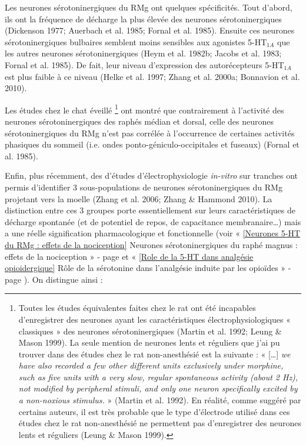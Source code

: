 \documentclass[a4paper,12pt,twoside]{report}
\begin{document}
Les neurones sérotoninergiques du RMg ont quelques spécificités. Tout d’abord, ils ont la fréquence de décharge la plus élevée des neurones sérotoninergiques (Dickenson 1977; Auerbach et al. 1985; Fornal et al. 1985). Ensuite ces neurones sérotoninergiques bulbaires semblent moins sensibles aux agonistes 5-HT$_{1A}$ que les autres neurones sérotoninergiques (Heym et al. 1982b; Jacobs et al. 1983; Fornal et al. 1985). De fait, leur niveau d’expression des autorécepteurs 5-HT$_{1A}$ est plus faible à ce niveau (Helke et al. 1997; Zhang et al. 2000a; Bonnavion et al. 2010).

Les études chez le chat éveillé
\footnote{Toutes les études équivalentes faites chez le rat ont été incapables d’enregistrer des neurones ayant les caractéristiques électrophysiologiques « classiques » des neurones sérotoninergiques (Martin et al. 1992; Leung \& Mason 1999). La seule mention de neurones lents et réguliers que j’ai pu trouver dans des études chez le rat non-anesthésié est la suivante : « […] \textit{we have also recorded a few other different units exclusively under morphine, such as five units with a very slow, regular spontaneous activity (about 2 Hz), not modified by peripheral stimuli, and only one neuron specifically excited by a non-noxious stimulus.} » (Martin et al. 1992). En réalité, comme suggéré par certains auteurs, il est très probable que le type d’électrode utilisé dans ces études chez le rat non-anesthésié ne permettent pas d’enregistrer des neurones lents et réguliers (Leung \& Mason 1999).}
ont montré que contrairement à l’activité des neurones sérotoninergiques des raphés médian et dorsal, celle des neurones sérotoninergiques du RMg n’est pas corrélée à l’occurrence de certaines activités phasiques du sommeil (i.e. ondes ponto-géniculo-occipitales et fuseaux) (Fornal et al. 1985).

Enfin, plus récemment, des d’études d’électrophysiologie \textit{in-vitro} sur tranches ont permis d’identifier 3 sous-populations de neurones sérotoninergiques du RMg projetant vers la moelle (Zhang et al. 2006; Zhang \& Hammond 2010). La distinction entre ces 3 groupes porte essentiellement sur leurs caractéristiques de décharge spontanée (et de potentiel de repos, de capacitance membranaire\ldots) mais a une réelle signification pharmacologique et fonctionnelle (voir « \ref{Neurones 5-HT du RMg : effets de la nociception} Neurones sérotoninergiques du raphé magnus : effets de la nociception » - page \pageref{Neurones 5-HT du RMg : effets de la nociception} et « \ref{Role de la 5-HT dans analgésie opioidergique} Rôle de la sérotonine dans l'analgésie induite par les opioïdes » - page \pageref{Role de la 5-HT dans analgésie opioidergique}). On distingue ainsi :
\end{document}
